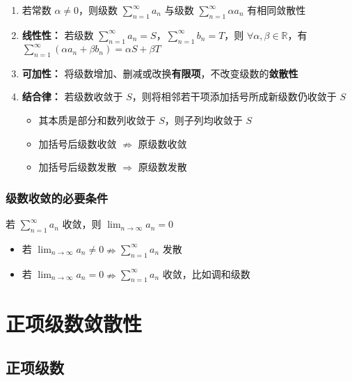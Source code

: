 \documentclass[lang = zh , final , oneside , openany , titlepage , zihao = -4 , linespread = 1.3 , baselineskip = false , cjk-font = windows , text-font = newtx , math-font = newtx]{sjtureport}
\begin{document}
\begin{enumerate}
\def\labelenumi{\arabic{enumi}.}
\item
  若常数 \(\alpha \neq 0\)，则级数
  \(\displaystyle \sum_{n=1}^\infty a_n\) 与级数
  \(\displaystyle \sum_{n=1}^\infty \alpha a_n\) 有相同敛散性
\item
  \textbf{线性性：} 若级数
  \(\displaystyle \sum_{n=1}^\infty a_n = S\)，\(\displaystyle \sum_{n=1}^\infty b_n = T\)，则
  \(\forall \alpha , \beta\in \mathbb{R}\)，有
  \(\displaystyle \sum_{n=1}^\infty (\alpha a_n + \beta b_n) = \alpha S + \beta T\)
\item
  \textbf{可加性：}
  将级数增加、删减或改换\textbf{有限项}，不改变级数的\textbf{敛散性}
\item
  \textbf{结合律：} 若级数收敛于
  \(S\)，则将相邻若干项添加括号所成新级数仍收敛于 \(S\)

  \begin{itemize}
  \item
    其本质是部分和数列收敛于 \(S\)，则子列均收敛于 \(S\)
  \item
    加括号后级数收敛 \(\nRightarrow\) 原级数收敛
  \item
    加括号后级数发散 \(\Rightarrow\) 原级数发散
  \end{itemize}
\end{enumerate}

\subsubsection{级数收敛的必要条件}

\begin{theorem}
    若 \(\displaystyle \sum_{n=1}^\infty a_n\) 收敛，则
\(\displaystyle \lim_{n\to\infty} a_n = 0\)
\end{theorem}

\begin{itemize}
\item
  若
  \(\displaystyle \lim_{n\to\infty} a_n \neq 0 \nRightarrow \displaystyle \sum_{n=1}^\infty a_n\)
  发散
\item
  若
  \(\displaystyle \lim_{n\to\infty} a_n = 0 \nRightarrow \displaystyle \sum_{n=1}^\infty a_n\)
  收敛，比如调和级数
\end{itemize}

\section{正项级数敛散性}

\subsection{正项级数}
\end{document}
